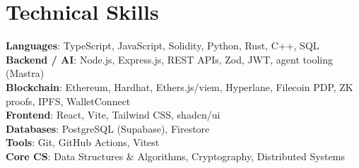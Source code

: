 \documentclass[letterpaper,11pt]{article}
\begin{document}
\section{Technical Skills}
  \begin{itemize}[leftmargin=0.15in, label={}]
    \small{\item{
      \textbf{Languages}{: TypeScript, JavaScript, Solidity, Python, Rust, C++, SQL} \\
      \textbf{Backend / AI}{: Node.js, Express.js, REST APIs, Zod, JWT, agent tooling (Mastra)} \\
      \textbf{Blockchain}{: Ethereum, Hardhat, Ethers.js/viem, Hyperlane, Filecoin PDP, ZK proofs, IPFS, WalletConnect} \\
      \textbf{Frontend}{: React, Vite, Tailwind CSS, shadcn/ui} \\
      \textbf{Databases}{: PostgreSQL (Supabase), Firestore} \\
      \textbf{Tools}{: Git, GitHub Actions, Vitest} \\
      \textbf{Core CS}{: Data Structures \& Algorithms, Cryptography, Distributed Systems}
    }}
  \end{itemize}
\end{document}

